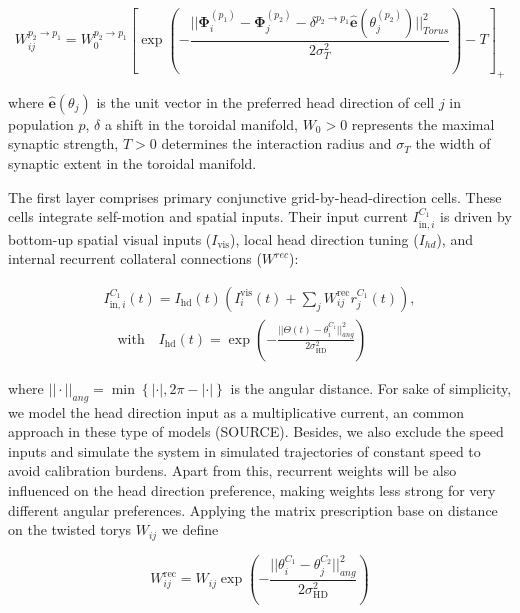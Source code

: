 \documentclass{article}
\begin{document}
\begin{equation}
    W_{ij}^{p_2\rightarrow p_1} = W_0^{p_2\rightarrow p_1} \left[\exp \left(-\frac{\Big|\Big|\bm \Phi_i^{(p_1)} - \bm \Phi_j^{(p_2)} - \delta^{p_2\rightarrow p_1} \hat{\bm e}\left(\theta_j^{(p_2)}\right)\Big|\Big|_{Torus}^2}{2\sigma_T^2}\right) - T\right]_+
\end{equation}

\noindent where $\hat {\bm e}(\theta_j)$ is the unit vector in the preferred head direction of cell $j$ in population $p$, $\delta$ a shift in the toroidal manifold, $W_0>0$ represents the maximal synaptic strength, $T>0$ determines the interaction radius and $\sigma_T$ the width of synaptic extent in the toroidal manifold.

The first layer comprises primary conjunctive grid-by-head-direction cells. These cells integrate self-motion and spatial inputs. Their input current $I_{\text{in},i}^{C_1}$ is driven by bottom-up spatial visual inputs ($I_\text{vis}$), local head direction tuning ($I_{hd}$), and internal recurrent collateral connections ($W^{rec}$):

\begin{equation}
    \begin{aligned}
        I_{\text{in},i}^{C_1}(t)=I_\text{hd}(t)\left( I^{\text{vis}}_i(t) + \sum_j W_{ij}^\text{rec} r_j^{C_1}(t) \right), \\
        \quad \text{with} \quad I_\text{hd}(t) = \exp\left(-\frac{\Big|\Big|\Theta(t)-\theta_i^{C_1}\Big|\Big|_{ang}^2}{2\sigma_\text{HD}^2}\right)
    \end{aligned}
\end{equation}

\noindent where $||\cdot||_{ang} = \min\left\{|\cdot|, 2\pi - |\cdot|\right\}$ is the angular distance. For sake of simplicity, we model the head direction input as a multiplicative current, an common approach in these type of models (SOURCE). Besides, we also exclude the speed inputs and simulate the system in simulated trajectories of constant speed to avoid calibration burdens. Apart from this, recurrent weights will be also influenced on the head direction preference, making weights less strong for very different angular preferences. Applying the matrix prescription base on distance on the twisted torys $W_{ij}$ we define

\begin{equation}
    W_{ij}^\text{rec} = W_{ij}  \exp\left(-\frac{\Big|\Big|\theta_i^{C_1}-\theta_j^{C_2}\Big|\Big|_{ang}^2}{2\sigma_\text{HD}^2}\right)
\end{equation}
\end{document}
